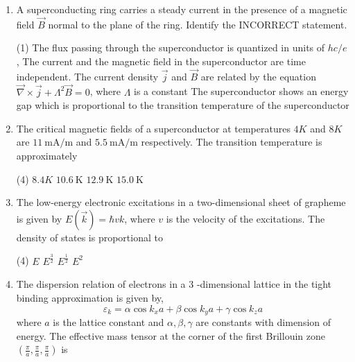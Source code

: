\begin{enumerate}
	{}
\begin{tasks}(1)
\task[\textbf{A.}] $T^{2}$ for the tetragonal solid, but as $T^{3}$ for the simple cubic solid
\task[\textbf{B.}]  $T$ for the tetragonal solid, and as $T^{3}$ for the simple cubic solid
\task[\textbf{C.}] $T$ for both solids
\task[\textbf{D.}] $T^{3}$ for both solids
\end{tasks}
	\item A superconducting ring carries a steady current in the presence of a magnetic field $\vec{B}$ normal to the plane of the ring. Identify the INCORRECT statement.
	{}
\begin{tasks}(1)
\task[\textbf{A.}] The flux passing through the superconductor is quantized in units of $h c / e$,
\task[\textbf{B.}] The current and the magnetic field in the superconductor are time independent.
\task[\textbf{C.}] The current density $\vec{j}$ and $\vec{B}$ are related by the equation $\vec{\nabla} \times \vec{j}+\Lambda^{2} \vec{B}=0$, where $\Lambda$ is a constant
\task[\textbf{D.}] The superconductor shows an energy gap which is proportional to the transition temperature of the superconductor
\end{tasks}
	\item The critical magnetic fields of a superconductor at temperatures $4 K$ and $8 K$ are $11 \mathrm{~mA} / \mathrm{m}$ and $5.5 \mathrm{~mA} / \mathrm{m}$ respectively. The transition temperature is approximately
	{}
\begin{tasks}(4)
\task[\textbf{A.}] $8.4 K$
\task[\textbf{B.}] $10.6 \mathrm{~K}$
\task[\textbf{C.}] $12.9 \mathrm{~K}$
\task[\textbf{D.}] $15.0 \mathrm{~K}$
\end{tasks}
	\item The low-energy electronic excitations in a two-dimensional sheet of grapheme is given by $E(\vec{k})=\hbar v k$, where $v$ is the velocity of the excitations. The density of states is proportional to
	{}
\begin{tasks}(4)
\task[\textbf{A.}] $E$
\task[\textbf{B.}] $E^{\frac{3}{2}}$
\task[\textbf{C.}] $E^{\frac{1}{2}}$
\task[\textbf{D.}] $E^{2}$
\end{tasks}
	\item The dispersion relation of electrons in a 3 -dimensional lattice in the tight binding approximation is given by,
	$$
	\varepsilon_{k}=\alpha \cos k_{x} a+\beta \cos k_{y} a+\gamma \cos k_{z} a
	$$
	where $a$ is the lattice constant and $\alpha, \beta, \gamma$ are constants with dimension of energy. The effective mass tensor at the corner of the first Brillouin zone $\left(\frac{\pi}{a}, \frac{\pi}{a}, \frac{\pi}{a}\right)$ is

\end{enumerate}

